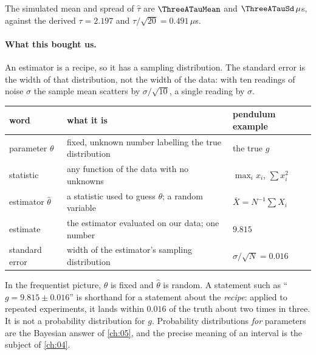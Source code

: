 The simulated mean and spread of $\hat\tau$ are $\ThreeATauMean$ and
$\ThreeATauSd\,\mu$s, against the derived $\tau=2.197$ and
$\tau/\sqrt{20}=0.491\,\mu$s.

\paragraph{What this bought us.}
An estimator is a recipe, so it has a sampling distribution. The standard
error is the width of that distribution, not the width of the data: with ten
readings of noise $\sigma$ the sample mean scatters by $\sigma/\sqrt{10}$, a
single reading by $\sigma$.

\begin{center}\small
\begin{tabularx}{\linewidth}{@{}lXl@{}}
\toprule
word & what it is & pendulum example\\
\midrule
parameter $\theta$ & fixed, unknown number labelling the true distribution & the true $g$\\
statistic & any function of the data with no unknowns & $\max_i x_i$, $\sum x_i^2$\\
estimator $\hat\theta$ & a statistic used to guess $\theta$; a random variable & $\bar X=N^{-1}\sum X_i$\\
estimate & the estimator evaluated on our data; one number & $9.815$\\
standard error & width of the estimator's sampling distribution & $\sigma/\sqrt N=0.016$\\
\bottomrule
\end{tabularx}
\end{center}

\begin{pitfall}
In the frequentist picture, $\theta$ is fixed and $\hat\theta$ is
random. A statement such as ``$g=9.815\pm0.016$'' is shorthand for a statement
about the \emph{recipe}: applied to repeated experiments, it lands within
$0.016$ of the truth about two times in three. It is not a probability
distribution for $g$. Probability distributions \emph{for} parameters are the
Bayesian answer of \cref{ch:05}, and the precise meaning of an interval is the
subject of \cref{ch:04}.
\end{pitfall}

